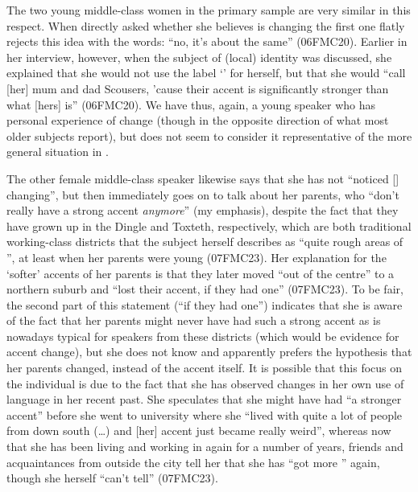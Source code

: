 The two young middle-class women in the primary sample are very similar in this respect.
When directly asked whether she believes  is changing the first one flatly rejects this idea with the words: ``no, it's about the same'' (06FMC20).
Earlier in her interview, however, when the subject of (local) identity was discussed, she explained that she would not use the label `' for herself, but that she would ``call [her] mum and dad Scousers, 'cause their accent is significantly stronger than what [hers] is'' (06FMC20).
We have thus, again, a young speaker who has personal experience of  change (though in the opposite direction of what most older subjects report), but does not seem to consider it representative of the more general situation in .

The other female middle-class speaker likewise says that she has not ``noticed [] changing'', but then immediately goes on to talk about her parents, who ``don't really have a strong  accent \emph{anymore}'' (my emphasis), despite the fact that they have grown up in the Dingle and Toxteth, respectively, which are both traditional working-class districts that the subject herself describes as ``quite rough areas of '', at least when her parents were young (07FMC23).
Her explanation for the `softer' accents of her parents is that they later moved ``out of the centre'' to a northern suburb and ``lost their accent, if they had one'' (07FMC23).
To be fair, the second part of this statement (``if they had one'') indicates that she is aware of the fact that her parents might never have had such a strong accent as is nowadays typical for speakers from these districts (which would be evidence for accent change), but she does not know and apparently prefers the hypothesis that her parents changed, instead of the accent itself.
It is possible that this focus on the individual is due to the fact that she has observed changes in her own use of language in her recent past.
She speculates that she might have had ``a stronger accent'' before she went to university where she ``lived with quite a lot of people from down south (\ldots) and [her] accent just became really weird'', whereas now that she has been living and working in  again for a number of years, friends and acquaintances from outside the city tell her that she has ``got more '' again, though she herself ``can't tell'' (07FMC23).


